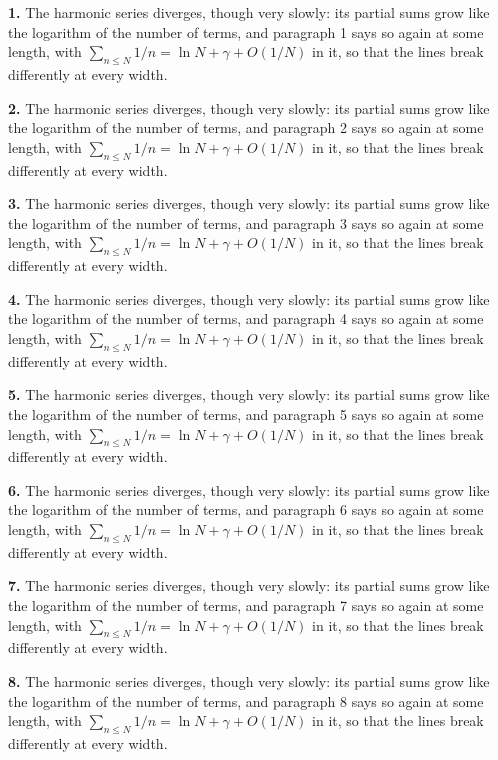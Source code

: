 \noindent\textbf{1.} The harmonic series diverges, though very slowly: its partial sums
grow like the logarithm of the number of terms, and paragraph 1 says so again
at some length, with $\sum_{n \le N} 1/n = \ln N + \gamma + O(1/N)$ in it,
so that the lines break differently at every width.

\noindent\textbf{2.} The harmonic series diverges, though very slowly: its partial sums
grow like the logarithm of the number of terms, and paragraph 2 says so again
at some length, with $\sum_{n \le N} 1/n = \ln N + \gamma + O(1/N)$ in it,
so that the lines break differently at every width.

\noindent\textbf{3.} The harmonic series diverges, though very slowly: its partial sums
grow like the logarithm of the number of terms, and paragraph 3 says so again
at some length, with $\sum_{n \le N} 1/n = \ln N + \gamma + O(1/N)$ in it,
so that the lines break differently at every width.

\noindent\textbf{4.} The harmonic series diverges, though very slowly: its partial sums
grow like the logarithm of the number of terms, and paragraph 4 says so again
at some length, with $\sum_{n \le N} 1/n = \ln N + \gamma + O(1/N)$ in it,
so that the lines break differently at every width.

\noindent\textbf{5.} The harmonic series diverges, though very slowly: its partial sums
grow like the logarithm of the number of terms, and paragraph 5 says so again
at some length, with $\sum_{n \le N} 1/n = \ln N + \gamma + O(1/N)$ in it,
so that the lines break differently at every width.

\noindent\textbf{6.} The harmonic series diverges, though very slowly: its partial sums
grow like the logarithm of the number of terms, and paragraph 6 says so again
at some length, with $\sum_{n \le N} 1/n = \ln N + \gamma + O(1/N)$ in it,
so that the lines break differently at every width.

\noindent\textbf{7.} The harmonic series diverges, though very slowly: its partial sums
grow like the logarithm of the number of terms, and paragraph 7 says so again
at some length, with $\sum_{n \le N} 1/n = \ln N + \gamma + O(1/N)$ in it,
so that the lines break differently at every width.

\noindent\textbf{8.} The harmonic series diverges, though very slowly: its partial sums
grow like the logarithm of the number of terms, and paragraph 8 says so again
at some length, with $\sum_{n \le N} 1/n = \ln N + \gamma + O(1/N)$ in it,
so that the lines break differently at every width.

